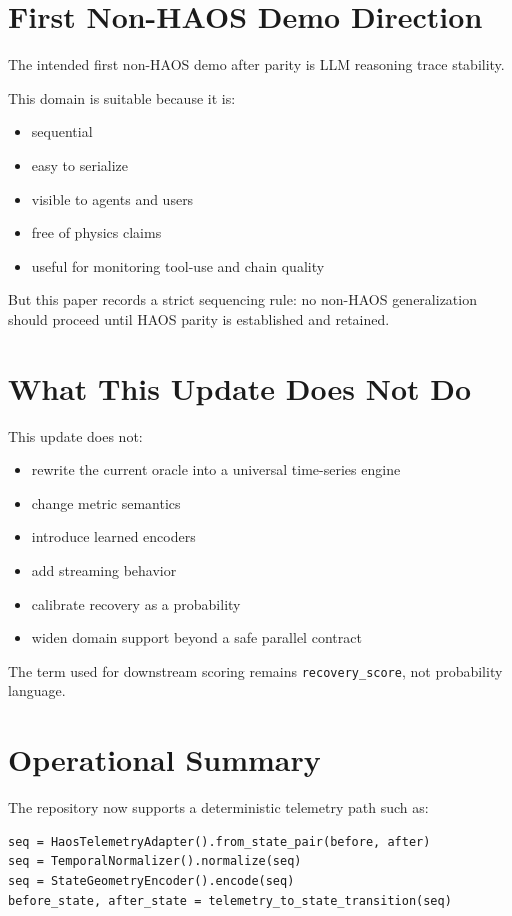 \documentclass[11pt]{article}
\begin{document}
\section{First Non-HAOS Demo Direction}

The intended first non-HAOS demo after parity is LLM reasoning trace stability.

This domain is suitable because it is:

\begin{itemize}
\item sequential
\item easy to serialize
\item visible to agents and users
\item free of physics claims
\item useful for monitoring tool-use and chain quality
\end{itemize}

But this paper records a strict sequencing rule:
no non-HAOS generalization should proceed until HAOS parity is established and retained.

\section{What This Update Does Not Do}

This update does not:

\begin{itemize}
\item rewrite the current oracle into a universal time-series engine
\item change metric semantics
\item introduce learned encoders
\item add streaming behavior
\item calibrate recovery as a probability
\item widen domain support beyond a safe parallel contract
\end{itemize}

The term used for downstream scoring remains \texttt{recovery\_score}, not probability language.

\section{Operational Summary}

The repository now supports a deterministic telemetry path such as:

\begin{verbatim}
seq = HaosTelemetryAdapter().from_state_pair(before, after)
seq = TemporalNormalizer().normalize(seq)
seq = StateGeometryEncoder().encode(seq)
before_state, after_state = telemetry_to_state_transition(seq)
\end{verbatim}
\end{document}
